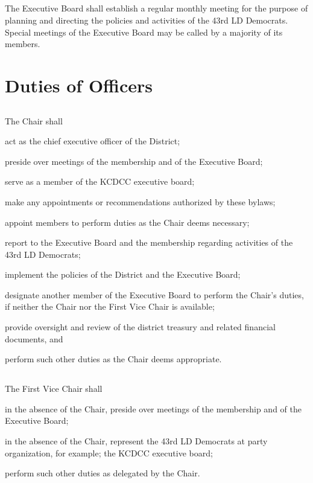 \documentclass{article}
\newcommand{\fortythird}{\nth{43}}
\newcommand{\district}{\fortythird{} District}
\newcommand{\thedistrict}{the \district{}}
\begin{document}
\subsection{}
The Executive Board shall establish a regular monthly meeting for the purpose of planning and directing the policies and activities of the 43rd LD Democrats. Special meetings of the Executive Board may be called by a majority of its members.

\section{Duties of Officers}
\subsection{}
The Chair shall
\begin{inlinealphalist}
    \item act as the chief executive officer of \thedistrict{};
    \item preside over meetings of the membership and of the Executive Board;
    \item serve as a member of the KCDCC executive board;
    \item make any appointments or recommendations authorized by these bylaws;
    \item appoint members to perform duties as the Chair deems necessary;
    \item report to the Executive Board and the membership regarding activities of the 43rd LD Democrats;
    \item implement the policies of \thedistrict{} and the Executive Board;
    \item designate another member of the Executive Board to perform the Chair’s duties, if neither the Chair nor the First Vice Chair is available;
    \item provide oversight and review of the district treasury and related financial documents, and
    \item perform such other duties as the Chair deems appropriate.
\end{inlinealphalist}

\subsection{}
The First Vice Chair shall
\begin{inlinealphalist}
    \item in the absence of the Chair, preside over meetings of the membership and of the Executive Board;
    \item in the absence of the Chair, represent the 43rd LD Democrats at party organization, for example; the KCDCC executive board;
    \item perform such other duties as delegated by the Chair.
\end{inlinealphalist}
\end{document}

